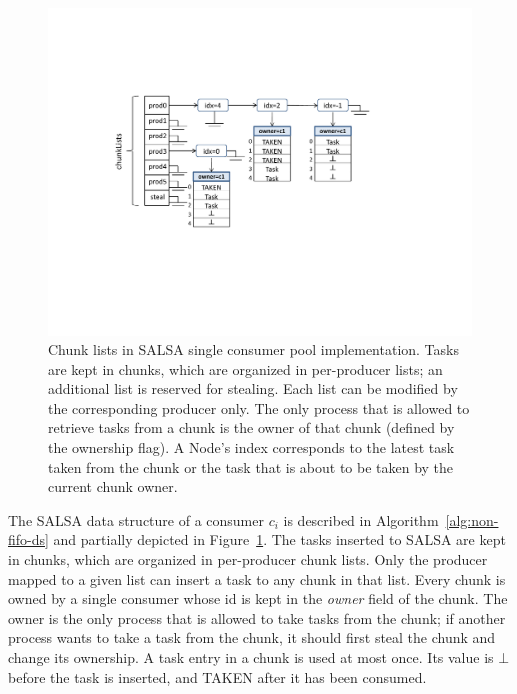 \begin{figure}[htb]
	\centering
	\includegraphics[height=0.3\textwidth]{figures/salsa-struct}
	\vspace{-10pt}
	\caption{
	    \footnotesize{Chunk lists in SALSA single consumer pool implementation. Tasks are kept in chunks, which are 
	    organized in per-producer lists; an additional list is reserved for stealing. Each list can be modified 
	    by the corresponding producer only. The only process that is allowed to retrieve tasks from a chunk is 
	    the owner of that chunk (defined by the ownership flag). A Node's index corresponds to the latest task taken from the chunk
	    or the task that is about to be taken by the current chunk owner. 
	    }}
	\label{fig:salsa-struct}
	\vspace{-5pt}
\end{figure}

The SALSA data structure of a consumer $c_i$ is described in Algorithm~\ref{alg:non-fifo-ds} and partially depicted in Figure~\ref{fig:salsa-struct}. 
The tasks inserted to SALSA are kept in chunks, which are organized in per-producer chunk lists. Only the producer mapped to a given list can insert a task to any chunk in that list. Every chunk is owned by a single consumer whose id is kept in the \emph{owner} field of the chunk.
The owner is the only process that is allowed to take tasks from the chunk; if another process wants to take a task from the chunk, it should first steal the chunk and change its ownership. 
A task entry in a chunk is used at most once. Its value is $\bot$ before the task is inserted, and TAKEN after it has been consumed.

